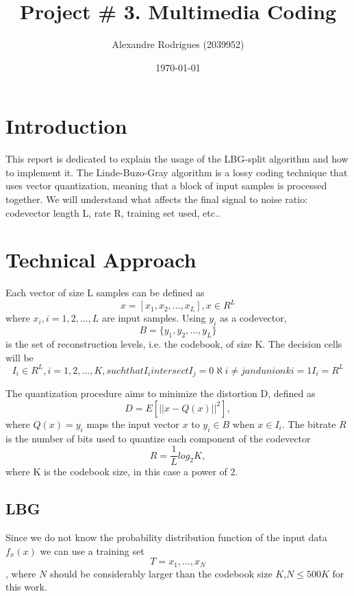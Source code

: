 \documentclass[a4paper, 11pt]{article}
\begin{document}
	
	\title{Project \# 3. Multimedia Coding }
	\author{{\small Alexandre Rodrigues (2039952)}}
	\date{\today}
	\maketitle
	
	\section{Introduction}
		This report is dedicated to explain the usage of the LBG-split algorithm and how to implement it.
		The Linde-Buzo-Gray algorithm is a lossy coding technique that uses vector quantization, meaning that a block of input samples is processed together.
		We will understand what affects the final signal to noise ratio: codevector length L, rate R, training set used, etc..
	
	\section{Technical Approach}
		Each vector of size L samples can be defined as
		\begin{equation}
			x = [x_1, x_2, \ldots, x_L], x \in R^L
		\end{equation}
		where $x_i, i=1,2,\ldots,L$ are input samples. 
		Using $y_i $ as a codevector, 
		\begin{equation}
			B =  \{y_1, y_2, \ldots, y_L\}
		\end{equation} 
		is the set of reconstruction levels, i.e. the codebook, of size K.
		The decision cells will be
		\begin{equation}
			I_i \in R^L, i = 1, 2, \ldots, K, such that I_i intersect I_j = 0 \aleph i \neq j and union k i=1 I_i = R^L
		\end{equation} 
		
		The quantization procedure aims to minimize the distortion D, defined as 
		\begin{equation}
			D = E [||x-Q(x)||^2],
		\end{equation} 
		where $ Q(x) = y_i $ maps the input vector $ x $ to $y_i \in B$ when $x \in I_i $.
		The bitrate $R$ is the number of bits used to quantize each component of the codevector
		\begin{equation}
			R = \frac{1}{L}log_2K,
			\label{eq:rate}
		\end{equation} 
		where K is the codebook size, in this case a power of 2.
			
		\subsection{LBG}
			Since we do not know the probability distribution function of the input data $ f_x(x) $ we can use a training set
			\begin{equation}
				T = {x_1,\ldots,x_N}
			\end{equation},
			where $N$ should be considerably larger than the codebook size $ K $,$  N \le 500K $ for this work.
			
\end{document}

